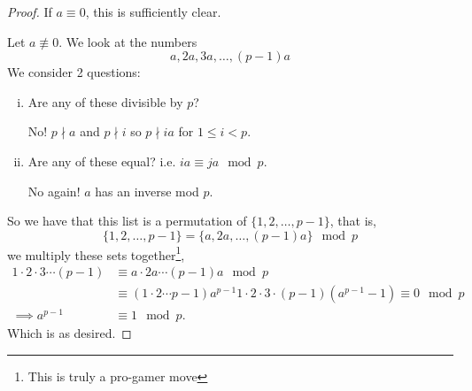 \begin{proof}
    If $a\equiv 0$, this is sufficiently clear. 

    Let $a\not\equiv 0$. We look at the numbers 
    \[a, 2a, 3a, \dots, (p-1)a\]
    We consider 2 questions: 
    \begin{enumerate}[i.]
        \item Are any of these divisible by $p$? 
        
        No! $p\nmid a$ and $p\nmid i$ so $p\nmid ia$ for $1\leq i < p$. 
        \item Are any of these equal? i.e. $ia\equiv ja\mod p$. 
        
        No again! $a$ has an inverse mod $p$. 
    \end{enumerate}
    So we have that this list is a permutation of $\{1, 2, \dots, p-1\}$, that is, 
    \[\{1, 2, \dots, p-1\} = \{a, 2a, \dots, (p-1)a\}\mod p\]
    we multiply these sets together\footnote{This is truly a pro-gamer move}, 
    \begin{align*}
        1\cdot 2\cdot 3\cdots (p-1) &\equiv a\cdot 2a\cdots (p-1)a \mod p \\
        &\equiv (1\cdot 2\cdots p-1)a^{p-1}
        1\cdot 2\cdot 3\cdot (p-1)(a^{p-1}-1)\equiv 0\mod p  \\\implies a^{p-1}&\equiv 1\mod p. 
    \end{align*}
    Which is as desired. 
\end{proof}